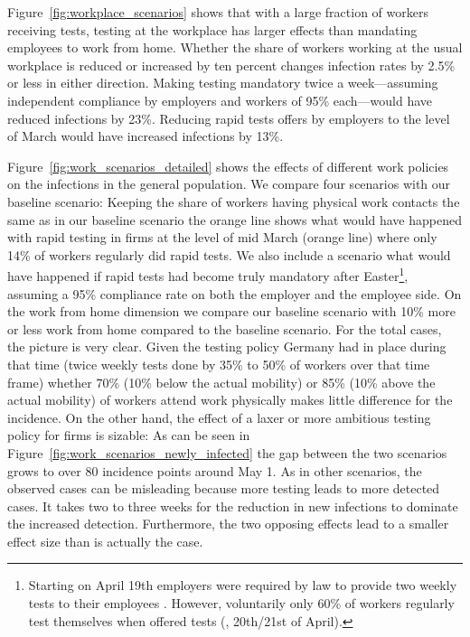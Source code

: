 Figure~\ref{fig:workplace_scenarios} shows that with a large fraction of workers
receiving tests, testing at the workplace has larger effects than mandating employees to
work from home. Whether the share of workers working at the usual workplace is reduced
or increased by ten percent changes infection rates by 2.5\% or less in either
direction. Making testing mandatory twice a week---assuming independent compliance by
employers and workers of 95\% each---would have reduced infections by 23\%. Reducing
rapid tests offers by employers to the level of March would have increased infections by
13\%.

Figure~\ref{fig:work_scenarios_detailed} shows the effects of different work policies on
the infections in the general population. We compare four scenarios with our baseline
scenario: Keeping the share of workers having physical work contacts the same as in our
baseline scenario the orange line shows what would have happened with rapid testing in
firms at the level of mid March (orange line) where only 14\% of workers regularly did
rapid tests. %
We also include a scenario what would have happened if rapid tests had become truly
mandatory after Easter\footnote{Starting on April 19th employers were required by law to
provide two weekly tests to their employees \citep{Bundesanzeiger2021}. However,
voluntarily only 60\% of workers regularly test themselves when offered tests
(\cite{Betsch2021}, 20th/21st of April).}, assuming a 95\% compliance rate on both the
employer and the employee side. On the work from home dimension we compare our baseline
scenario with 10\% more or less work from home compared to the baseline scenario. For the
total cases, the picture is very clear. Given the testing policy Germany had in place
during that time (twice weekly tests done by 35\% to 50\% of workers over that time
frame) whether 70\% (10\% below the actual mobility) or 85\% (10\% above the actual
mobility) of workers attend work physically makes little difference for the incidence. On
the other hand, the effect of a laxer or more ambitious testing policy for firms is
sizable: As can be seen in Figure~\ref{fig:work_scenarios_newly_infected} the gap between
the two scenarios grows to over 80 incidence points around May 1.%
As in other scenarios, the observed cases can be misleading because more testing leads to
more detected cases. It takes two to three weeks for the reduction in new infections to
dominate the increased detection. Furthermore, the two opposing effects lead to a
smaller effect size than is actually the case.


